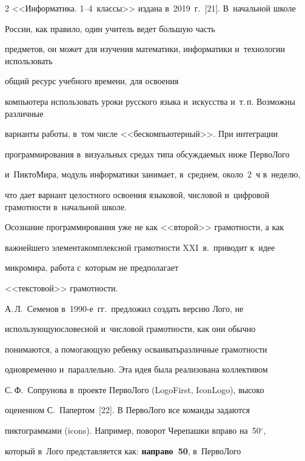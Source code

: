 \begin{multicols}{2}
<<Информатика. 1--4~классы>> издана в~2019~г.~[21]. В~начальной школе 


России, как правило, один учитель ведет б$\acute{\mbox{о}}$льшую часть 


предметов, он может для изучения математики, информатики и~технологии использовать 


общий ресурс учебного времени, для освоения 


компьютера использовать уроки русского языка и~искусства и~т.\,п. Возможны различные 


варианты работы, в~том числе <<бескомпьютерный>>. При интеграции 


программирования в~визуальных средах типа обсуждаемых ниже \mbox{ПервоЛого} 


и~ПиктоМира, модуль информатики занимает, в~среднем, около~2~ч в~неделю,


 что дает вариант целостного освоения языковой, числовой и~цифровой грамотности в~начальной школе.


  


  Осознание программирования уже не как <<второй>> грамотности, а как 


важнейшего элемента\linebreak комплексной грамотности XXI~в.\ приводит к~идее 


микромира, работа с~которым не предполагает %


 <<текс\-то\-вой>> грамотности. 


А.\,Л.~Семенов в~\mbox{1990-е~гг.}\ предложил создать версию Лого, не 


исполь\-зу\-ющую\linebreak словесной и~числовой грамотности, как они обычно 


понимаются, а помогающую ребенку осваивать\linebreak различные грамотности 


одновременно и~параллельно. Эта идея была реализована коллективом\linebreak 


С.\,Ф.~Сопрунова в~проекте ПервоЛого (LogoFirst, IconLogo), высоко 


оцененном С.~Папертом~[22]. В ПервоЛого все команды задаются 


пиктограммами (icons). Например, поворот Черепашки вправо на~50$^\circ$, 


который в~Лого представляется как: \textbf{направо~50}, в~ПервоЛого 



\end{multicols}
